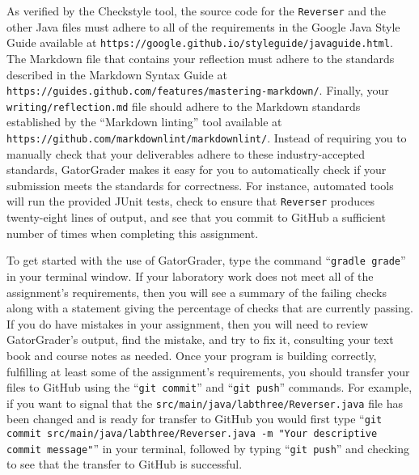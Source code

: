 \documentclass[11pt]{article}
\newcommand{\mainprogram}{\lstinline{Reverser}}
\newcommand{\mainprogramsource}{\lstinline{src/main/java/labthree/Reverser.java}}
\newcommand{\mainprogramoutput}{twenty-eight}
\newcommand{\reflection}{\lstinline{writing/reflection.md}}
\newcommand{\gatorgraderstart}{\command{gradle grade}}
\newcommand{\gatorgradercheck}{\command{gradle grade}}
\newcommand{\gitcommit}{\command{git commit}}
\newcommand{\gitpush}{\command{git push}}
\newcommand{\gitcommitmainprogram}{\command{git commit src/main/java/labthree/Reverser.java -m "Your
descriptive commit message"}}
\newcommand{\command}[1]{``\lstinline{#1}''}
\newcommand{\url}[1]{\lstinline{#1}}
\newcommand{\step}[1]{``{#1}''}
\begin{document}
As verified by the Checkstyle tool, the source code for the \mainprogram{} and
the other Java files must adhere to all of the requirements in the Google Java
Style Guide available at
\url{https://google.github.io/styleguide/javaguide.html}. The Markdown file that
contains your reflection must adhere to the standards described in the Markdown
Syntax Guide at \url{https://guides.github.com/features/mastering-markdown/}.
Finally, your \reflection{} file should adhere to the Markdown standards
established by the \step{Markdown linting} tool available at
\url{https://github.com/markdownlint/markdownlint/}. Instead of requiring you to
manually check that your deliverables adhere to these industry-accepted
standards, GatorGrader makes it easy for you to automatically check if your
submission meets the standards for correctness. For instance, automated tools
will run the provided JUnit tests, check to ensure that \mainprogram{} produces
\mainprogramoutput{} lines of output, and see that you commit to GitHub a
sufficient number of times when completing this assignment.

To get started with the use of GatorGrader, type the command
\gatorgraderstart{} in your terminal window. If your laboratory work does not
meet all of the assignment's requirements, then you will see a summary of the
failing checks along with a statement giving the percentage of checks that are
currently passing. If you do have mistakes in your assignment, then you will
need to review GatorGrader's output, find the mistake, and try to fix it,
consulting your text book and course notes as needed. Once your program is
building correctly, fulfilling at least some of the assignment's requirements,
you should transfer your files to GitHub using the \gitcommit{} and \gitpush{}
commands. For example, if you want to signal that the \mainprogramsource{} file
has been changed and is ready for transfer to GitHub you would first type
\gitcommitmainprogram{} in your terminal, followed by typing \gitpush{} and
checking to see that the transfer to GitHub is successful.

\end{document}
